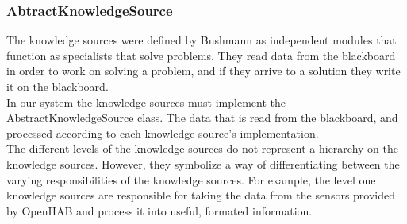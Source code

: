 \subsubsection{AbtractKnowledgeSource}
\label{AbtractKnowledgeSource}
The knowledge sources were defined by Bushmann \etAl\cite{Buschmann:1996:PSA:249013} as independent modules that function as specialists that solve problems. They read data from the blackboard in order to work on solving a problem, and if they arrive to a solution they write it on the blackboard.\\
In our system the knowledge sources must implement the AbstractKnowledgeSource class. The data that is read from the blackboard, and processed according to each knowledge source's implementation.\\
The different levels of the knowledge sources do not represent a hierarchy on the knowledge sources. However, they symbolize a way of differentiating between the varying responsibilities of the knowledge sources. For example, the level one knowledge sources are responsible for taking the data from the sensors provided by OpenHAB and process it into useful, formated information. 

